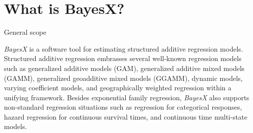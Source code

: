 \chapter{What is BayesX?}

\begin{stanza}{General scope}

{\it BayesX} is a software tool for estimating structured additive
regression models. Structured additive regression embrasses
several well-known regression models such as generalized additive
models (GAM), generalized additive mixed models (GAMM),
generalized geoadditive mixed models (GGAMM), dynamic models,
varying coefficient models, and geographically weighted regression
within a unifying framework. Besides exponential family
regression, {\em BayesX} also supports non-standard regression
situations such as regression for categorical responses, hazard
regression for continuous survival times, and continuous time
multi-state models.
\end{stanza}

